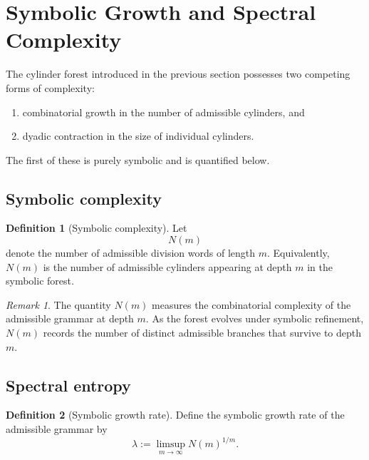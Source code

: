 \documentclass[12pt, oneside]{article}
\numberwithin{equation}{section}
\theoremstyle{definition}
\newtheorem{definition}{Definition}[section]
\theoremstyle{plain}
\theoremstyle{remark}
\newtheorem*{remark}{Remark}
\begin{document}
\section{Symbolic Growth and Spectral Complexity}
\label{sec:symbolic-growth}

The cylinder forest introduced in the previous section possesses two
competing forms of complexity:

\begin{enumerate}
\item combinatorial growth in the number of admissible cylinders, and
\item dyadic contraction in the size of individual cylinders.
\end{enumerate}

The first of these is purely symbolic and is quantified below.

\subsection{Symbolic complexity}

\begin{definition}[Symbolic complexity]
Let
\[
N(m)
\]
denote the number of admissible division words of length \(m\).
Equivalently, \(N(m)\) is the number of admissible cylinders appearing
at depth \(m\) in the symbolic forest.
\end{definition}

\begin{remark}
The quantity \(N(m)\) measures the combinatorial complexity of the
admissible grammar at depth \(m\). As the forest evolves under symbolic
refinement, \(N(m)\) records the number of distinct admissible branches
that survive to depth \(m\).
\end{remark}

\subsection{Spectral entropy}

\begin{definition}[Symbolic growth rate]
Define the symbolic growth rate of the admissible grammar by
\[
\lambda := \limsup_{m\to\infty} N(m)^{1/m}.
\]
\end{definition}
\end{document}
